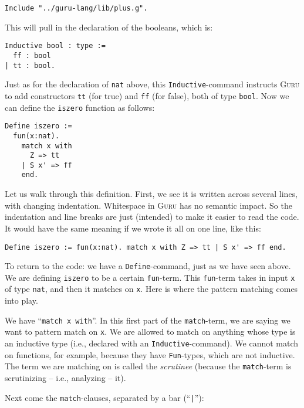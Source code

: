 \documentclass{book}[12pt]
\newcommand{\guru}[0]{\textsc{Guru}\xspace}
\begin{document}
\begin{verbatim}
Include "../guru-lang/lib/plus.g".
\end{verbatim}

\noindent This will pull in the declaration of the booleans, which is:

\begin{verbatim}
Inductive bool : type :=
  ff : bool
| tt : bool.
\end{verbatim}

\noindent Just as for the declaration of \texttt{nat} above, this
\texttt{Inductive}-command instructs \guru to add constructors
\texttt{tt} (for true) and \texttt{ff} (for false), both of type
\texttt{bool}.  Now we can define the \texttt{iszero} function as
follows:

\begin{verbatim}
Define iszero := 
  fun(x:nat). 
    match x with 
      Z => tt 
    | S x' => ff
    end.
\end{verbatim}

\noindent Let us walk through this definition.  First, we see it is
written across several lines, with changing indentation.  Whitespace
in \guru has no semantic impact.  So the indentation and line breaks
are just (intended) to make it easier to read the code.  It would have
the same meaning if we wrote it all on one line, like this:

\begin{verbatim}
Define iszero := fun(x:nat). match x with Z => tt | S x' => ff end.
\end{verbatim}

\noindent To return to the code: we have a \texttt{Define}-command,
just as we have seen above.  We are defining \texttt{iszero} to be a
certain \texttt{fun}-term.  This \texttt{fun}-term takes in input
\texttt{x} of type \texttt{nat}, and then it matches on \texttt{x}.
Here is where the pattern matching comes into play.  

We have ``\texttt{match x with}''.  In this first part of the
\texttt{match}-term, we are saying we want to pattern match on
\texttt{x}.  We are allowed to match on anything whose type is an
inductive type (i.e., declared with an \texttt{Inductive}-command).
We cannot match on functions, for example, because they have
\texttt{Fun}-types, which are not inductive.  The term we are matching
on is called the \emph{scrutinee} (because the \texttt{match}-term is
scrutinizing -- i.e., analyzing -- it).  

Next come the \texttt{match}-clauses, separated by a bar (``\texttt{|}''):
\end{document}

